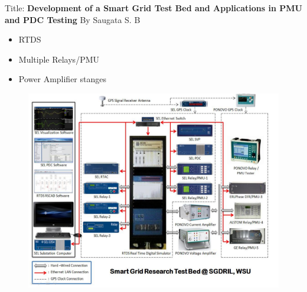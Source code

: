 \documentclass{beamer}
\begin{document}
\begin{frame}
Title: \textbf{Development of a Smart Grid Test Bed and Applications in PMU and PDC Testing} By Saugata S. B
\begin{itemize}
\item RTDS
\item Multiple Relays/PMU
\item Power Amplifier stanges 
\end{itemize}
\begin{figure}
\includegraphics[scale=0.28]{wsu_pmu_setup.png}
\end{figure}
\end{frame}

\begin{frame}

\end{frame}   
\end{document}
